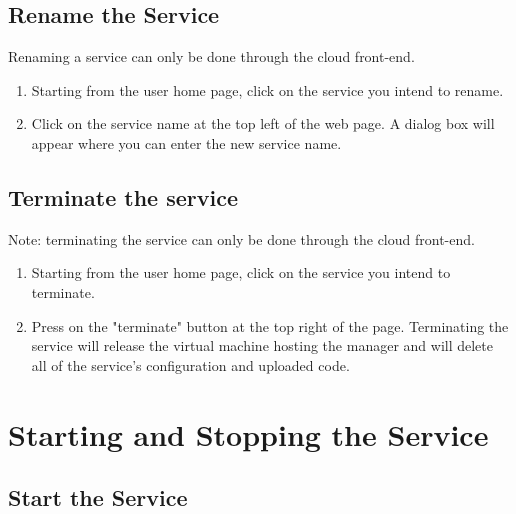 \documentclass[12pt]{article}
\begin{document}
\subsection{Rename the Service}
Renaming a service can only be done through the cloud front-end. 
\begin{enumerate}
\item Starting from the user home page, click on the service you intend to
      rename.
\item Click on the service name at the top left of the web
      page. A dialog box will appear where you can enter the new service
      name.
\end{enumerate}

\subsection{Terminate the service}
Note: terminating the service can only be done through the cloud front-end.
\begin{enumerate}
\item Starting from the user home page, click on the service you intend to
      terminate.
\item Press on the "terminate" button at the top right of the page.
      Terminating the service will release the virtual machine hosting
      the manager and will delete all of the service's configuration and
      uploaded code.
\end{enumerate}

\section{Starting and Stopping the Service}

\subsection{Start the Service}
\end{document}
